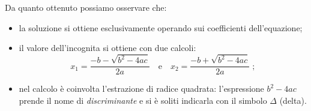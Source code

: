 
Da quanto ottenuto possiamo osservare che:
\begin{itemize}
\item la soluzione si ottiene esclusivamente operando sui coefficienti
dell'equazione;
\item il valore dell'incognita si ottiene con due calcoli:
\[x_{1} = \dfrac{- b - \sqrt{b^{2} - 4 ac}}{2 a}\quad\text{e}\quad x_{2} = \dfrac{- b + \sqrt{b^{2} - 4 ac}}{2 a}\;;\]
\item nel calcolo è coinvolta l'estrazione di radice quadrata: l'espressione $b^{2} - 4 ac$ prende il nome di \emph{discriminante} e si è soliti indicarla con il simbolo $\Delta$ (delta).
\end{itemize}

